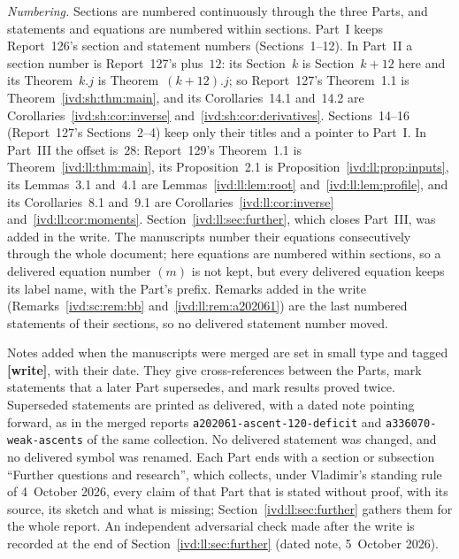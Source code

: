\documentclass[11pt,letterpaper]{article}
\theoremstyle{remark}\newtheorem{remark}[theorem]{Remark}
\numberwithin{equation}{section}
\newcommand{\file}[1]{\nolinkurl{#1}}
\begin{document}
\emph{Numbering.} Sections are numbered continuously through the three Parts, and statements and equations are numbered within sections. Part~I keeps Report~126's section and statement numbers (Sections~1--12). In Part~II a section number is Report~127's plus~$12$: its Section~$k$ is Section~$k+12$ here and its Theorem~$k.j$ is Theorem~$(k+12).j$; so Report~127's Theorem~1.1 is Theorem~\ref{ivd:sh:thm:main}, and its Corollaries~14.1 and~14.2 are Corollaries~\ref{ivd:sh:cor:inverse} and~\ref{ivd:sh:cor:derivatives}. Sections~14--16 (Report~127's Sections~2--4) keep only their titles and a pointer to Part~I. In Part~III the offset is~$28$: Report~129's Theorem~1.1 is Theorem~\ref{ivd:ll:thm:main}, its Proposition~2.1 is Proposition~\ref{ivd:ll:prop:inputs}, its Lemmas~3.1 and~4.1 are Lemmas~\ref{ivd:ll:lem:root} and~\ref{ivd:ll:lem:profile}, and its Corollaries~8.1 and~9.1 are Corollaries~\ref{ivd:ll:cor:inverse} and~\ref{ivd:ll:cor:moments}. Section~\ref{ivd:ll:sec:further}, which closes Part~III, was added in the write. The manuscripts number their equations consecutively through the whole document; here equations are numbered within sections, so a delivered equation number $(m)$ is not kept, but every delivered equation keeps its label name, with the Part's prefix. Remarks added in the write (Remarks~\ref{ivd:sc:rem:bb} and~\ref{ivd:ll:rem:a202061}) are the last numbered statements of their sections, so no delivered statement number moved.

Notes added when the manuscripts were merged are set in small type and tagged \textbf{[write]}, with their date. They give cross-references between the Parts, mark statements that a later Part supersedes, and mark results proved twice. Superseded statements are printed as delivered, with a dated note pointing forward, as in the merged reports \file{a202061-ascent-120-deficit} and \file{a336070-weak-ascents} of the same collection. No delivered statement was changed, and no delivered symbol was renamed. Each Part ends with a section or subsection ``Further questions and research'', which collects, under Vladimir's standing rule of 4~October 2026, every claim of that Part that is stated without proof, with its source, its sketch and what is missing; Section~\ref{ivd:ll:sec:further} gathers them for the whole report. An independent adversarial check made after the write is recorded at the end of Section~\ref{ivd:ll:sec:further} (dated note, 5~October 2026).
\end{document}
